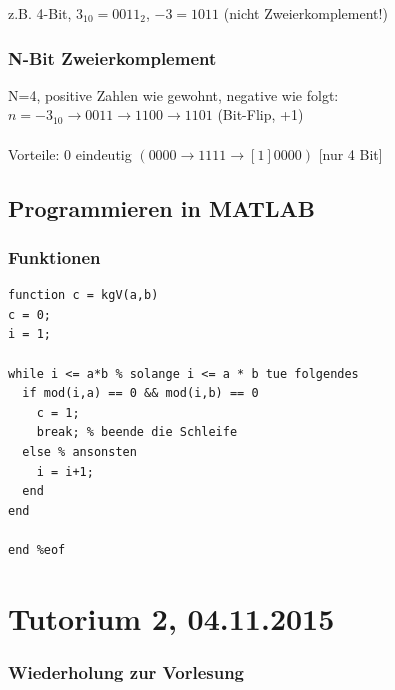 \documentclass{llncs}
\begin{document}
z.B. 4-Bit, $3_{10} = 0011_2$, $-3 = 1011$ (nicht Zweierkomplement!)

\subsection*{N-Bit Zweierkomplement}

N=4, positive Zahlen wie gewohnt, negative wie folgt:\\
$n = -3_{10} \rightarrow 0011 \rightarrow 1100 \rightarrow 1101$ (Bit-Flip, +1)\\
\\
Vorteile: $0$ eindeutig $(0000 \rightarrow 1111 \rightarrow [1]0000)$ [nur 4 Bit] 

\section*{Programmieren in MATLAB}

\subsection*{Funktionen}

\begin{verbatim}
function c = kgV(a,b)
c = 0;
i = 1;

while i <= a*b % solange i <= a * b tue folgendes
  if mod(i,a) == 0 && mod(i,b) == 0
    c = 1;
    break; % beende die Schleife
  else % ansonsten
    i = i+1;
  end
end

end %eof
\end{verbatim}


\chapter*{Tutorium 2, 04.11.2015}

\subsection*{Wiederholung zur Vorlesung}
\end{document}

